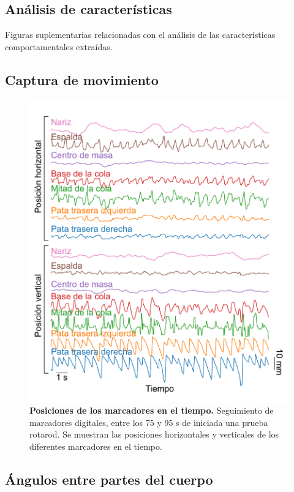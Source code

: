 \begin{appendix}
    \chapter{Análisis de características}\label{cha:apendice_caracteristicas}

    Figuras suplementarias relacionadas con el análisis de las características comportamentales extraídas.

    \section{Captura de movimiento}\label{sec:apendice_captura_movimiento}

    \begin{figure}[htbp]
        \centering
        \includegraphics[width=0.6\linewidth]{figuras/capitulo2/posiciones.pdf}
        \caption{\textbf{Posiciones de los marcadores en el tiempo.}
            Seguimiento de marcadores digitales, entre los 75 y 95 s de iniciada una prueba rotarod.
            Se muestran las posiciones horizontales y verticales de los diferentes marcadores en el tiempo.}
        \label{fig:capitulo2_posiciones}
    \end{figure}

    \clearpage

    \section{Ángulos entre partes del cuerpo}\label{sec:apendice_angulos_entre_partes}


\end{appendix}
